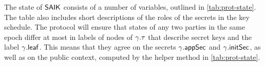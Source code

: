 
The state of ${\normalfont\textsf{SAIK}}$ consists of a number of variables, outlined in \cref{tab:prot-state}. The table also includes short
descriptions of the roles of the secrets in the key schedule. The protocol will ensure that states of any two parties in the same epoch differ at most in labels of nodes of $\gamma.\tau$ that describe secret keys and the label $\gamma.{\mathsf{leaf}}$. This means that they agree on the secrets $\gamma.{\mathsf{appSec}}$ and $\gamma.{\mathsf{initSec}}$, as well as on the public context, computed by the helper method in \cref{tab:prot-state}.



